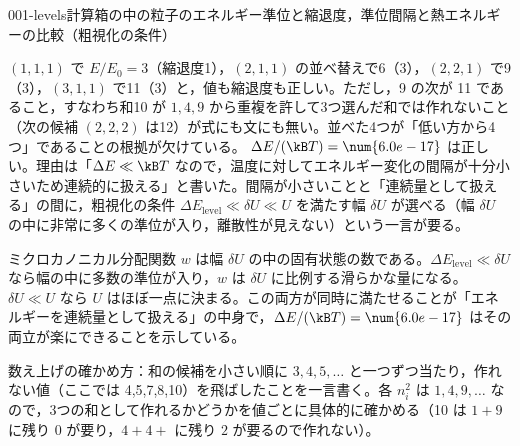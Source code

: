 \documentclass[uplatex,dvipdfmx,a4paper,11pt]{jsarticle}
\begin{document}
\begin{mondai}{001-levels}{計算}{箱の中の粒子のエネルギー準位と縮退度，準位間隔と熱エネルギーの比較（粗視化の条件）}
\begin{kotaeran}
   $(1,1,1)$ で $E/E_{0}=3$（縮退度1），$(2,1,1)$ の並べ替えで6（3），$(2,2,1)$ で9（3），$(3,1,1)$ で11（3）と，値も縮退度も正しい。ただし，9 の次が 11 であること，すなわち和10 が $1,4,9$ から重複を許して3つ選んだ和では作れないこと（次の候補 $(2,2,2)$ は12）が式にも文にも無い。並べた4つが「低い方から4つ」であることの根拠が欠けている。
   $\Delta E/(\kB T)=\num{6.0e-17}$ は正しい。理由は「$\Delta E\ll\kB T$ なので，温度に対してエネルギー変化の間隔が十分小さいため連続的に扱える」と書いた。間隔が小さいことと「連続量として扱える」の間に，粗視化の条件 $\Delta E_{\mathrm{level}}\ll\delta U\ll U$ を満たす幅 $\delta U$ が選べる（幅 $\delta U$ の中に非常に多くの準位が入り，離散性が見えない）という一言が要る。
\end{kotaeran}
\begin{rikai}
  \item ミクロカノニカル分配関数 $w$ は幅 $\delta U$ の中の固有状態の数である。$\Delta E_{\mathrm{level}}\ll\delta U$ なら幅の中に多数の準位が入り，$w$ は $\delta U$ に比例する滑らかな量になる。$\delta U\ll U$ なら $U$ はほぼ一点に決まる。この両方が同時に満たせることが「エネルギーを連続量として扱える」の中身で，$\Delta E/(\kB T)=\num{6.0e-17}$ はその両立が楽にできることを示している。
  \item 数え上げの確かめ方：和の候補を小さい順に $3,4,5,\dots$ と一つずつ当たり，作れない値（ここでは 4,5,7,8,10）を飛ばしたことを一言書く。各 $n_{i}^{2}$ は $1,4,9,\dots$ なので，3つの和として作れるかどうかを値ごとに具体的に確かめる（10 は $1+9$ に残り $0$ が要り，$4+4+$ に残り $2$ が要るので作れない）。
\end{rikai}
\end{mondai}
\end{document}
